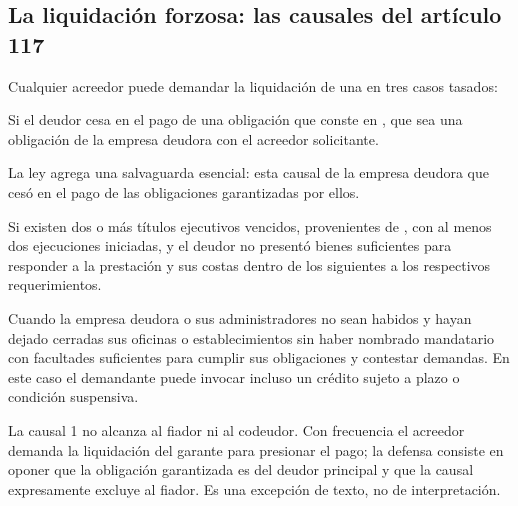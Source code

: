 \subsection{La liquidación forzosa: las causales del artículo 117}

Cualquier acreedor puede demandar la liquidación de una \empresadeudora{} en tres casos
tasados:

\begin{description}[leftmargin=0pt,style=nextline,font=\sffamily\bfseries]
  \item[Causal 1 — Cesación en el pago de un título ejecutivo] Si el deudor cesa en el pago
  de una obligación que conste en , que sea una
  obligación  de la empresa deudora con el acreedor
  solicitante.

  La ley agrega una salvaguarda esencial: esta causal  de la empresa deudora
  que cesó en el pago de las obligaciones garantizadas por ellos.

  \item[Causal 2 — Dos ejecuciones sin bienes suficientes] Si existen dos o más títulos
  ejecutivos vencidos, provenientes de , con al menos dos
  ejecuciones iniciadas, y el deudor no presentó bienes suficientes para responder a la
  prestación y sus costas dentro de los  siguientes a los respectivos
  requerimientos.

  \item[Causal 3 — Deudor no habido] Cuando la empresa deudora o sus administradores no
  sean habidos y hayan dejado cerradas sus oficinas o establecimientos sin haber nombrado
  mandatario con facultades suficientes para cumplir sus obligaciones y contestar demandas.
  En este caso el demandante puede invocar incluso un crédito sujeto a plazo o condición
  suspensiva.
\end{description}

\begin{foco}
La causal 1 no alcanza al fiador ni al codeudor. Con frecuencia el acreedor demanda la
liquidación del garante para presionar el pago; la defensa consiste en oponer que la
obligación garantizada es del deudor principal y que la causal expresamente excluye al
fiador. Es una excepción de texto, no de interpretación.
\end{foco}

